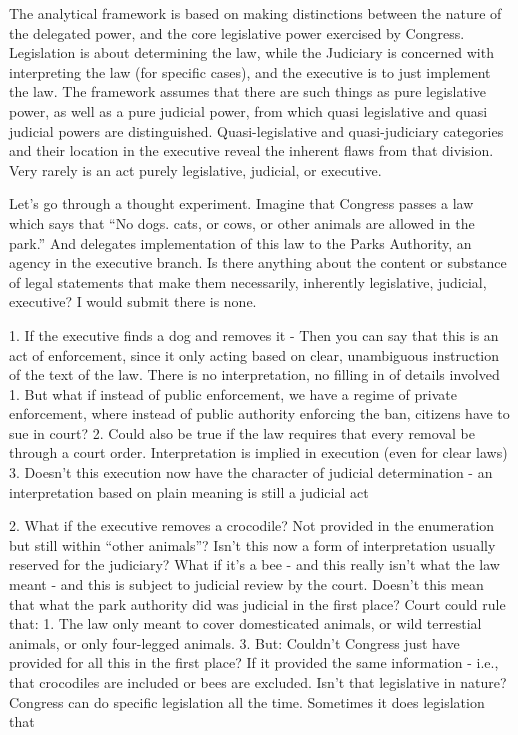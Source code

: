 \documentclass[../main.tex]{subfiles}
\begin{document}
\begin{shaded}

The analytical framework is based on making distinctions between the nature of the delegated power, and the core legislative power exercised by Congress. Legislation is about determining the law, while the Judiciary is concerned with interpreting the law (for specific cases), and the executive is to just implement the law. The framework assumes that there are such things as pure legislative power, as well as a pure judicial power, from which quasi legislative and quasi judicial powers are distinguished. Quasi-legislative and quasi-judiciary categories and their location in the executive reveal the inherent flaws from that division. Very rarely is an act purely legislative, judicial, or executive.

Let’s go through a thought experiment. Imagine that Congress passes a law which says that “No dogs. cats, or cows, or other animals are allowed in the park.” And delegates implementation of this law to the Parks Authority, an agency in the executive branch. Is there anything about the content or substance of legal statements that make them necessarily, inherently legislative, judicial, executive? I would submit there is none.

1. If the executive finds a dog and removes it - Then you can say that this is an act of enforcement, since it only acting based on clear, unambiguous instruction of the text of the law. There is no interpretation, no filling in of details involved
    1. But what if instead of public enforcement, we have a regime of private enforcement, where instead of public authority enforcing the ban, citizens have to sue in court?
    2. Could also be true if the law requires that every removal be through a court order. Interpretation is implied in execution (even for clear laws)
    3. Doesn’t this execution now have the character of judicial determination - an interpretation based on plain meaning is still a judicial act
    
2. What if the executive removes a crocodile? Not provided in the enumeration but still within “other animals”? Isn’t this now a form of interpretation usually reserved for the judiciary? What if it’s a bee - and this really isn’t what the law meant - and this is subject to judicial review by the court. Doesn’t this mean that what the park authority did was judicial in the first place? Court could rule that: 1. The law only meant to cover domesticated animals, or wild terrestial animals, or only four-legged animals.
3. But: Couldn’t Congress just have provided for all this in the first place? If it provided the same information - i.e., that crocodiles are included or bees are excluded. Isn’t that legislative in nature? Congress can do specific legislation all the time. Sometimes it does legislation that


\end{shaded}
\end{document}
